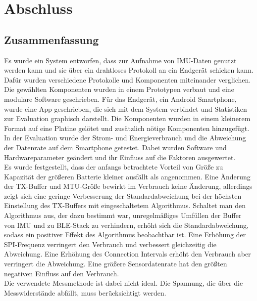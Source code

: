 \chapter{Abschluss}
\label{ch:closure}

\section{Zusammenfassung}
Es wurde ein System entworfen, dass zur Aufnahme von IMU-Daten genutzt werden kann und sie über ein drahtloses Protokoll an ein Endgerät schicken kann.
Dafür wurden verschiedene Protokolle und Komponenten miteinander verglichen.
Die gewählten Komponenten wurden in einem Prototypen verbaut und eine modulare Software geschrieben.
Für das Endgerät, ein Android Smartphone, wurde eine App geschrieben, die sich mit dem System verbindet und Statistiken zur Evaluation graphisch darstellt.
Die Komponenten wurden in einem kleinerem Format auf eine Platine gelötet und zusätzlich nötige Komponenten hinzugefügt.
In der Evaluation wurde der Strom- und Energieverbrauch und die Abweichung der Datenrate auf dem Smartphone getestet.
Dabei wurden Software und Hardwareparameter geändert und ihr Einfluss auf die Faktoren ausgewertet.\\
Es wurde festgestellt, dass der anfangs betrachtete Vorteil von Größe zu Kapazität der größeren Batterie kleiner ausfällt als angenommen.
Eine Änderung der TX-Buffer und MTU-Größe bewirkt im Verbrauch keine Änderung, allerdings zeigt sich eine geringe Verbesserung der Standardabweichung bei der höchsten Einstellung des TX-Buffers mit eingeschaltetem Algorithmus.
Schaltet man den Algorithmus aus, der dazu bestimmt war, unregelmäßiges Umfüllen der Buffer von IMU und zu BLE-Stack zu verhindern, erhöht sich die Standardabweichung, sodass ein positiver Effekt des Algorithmus beobachtbar ist.
Eine Erhöhung der SPI-Frequenz verringert den Verbrauch und verbessert gleichzeitig die Abweichung.
Eine Erhöhung des Connection Intervals erhöht den Verbrauch aber verringert die Abweichung.
Eine größere Sensordatenrate hat den größten negativen Einfluss auf den Verbrauch.\\
Die verwendete Messmethode ist dabei nicht ideal.
Die Spannung, die über die Messwiderstände abfällt, muss berücksichtigt werden.
